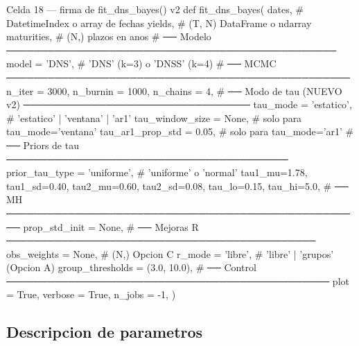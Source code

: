 \documentclass[12pt, a4paper]{article}
\theoremstyle{plain}
\theoremstyle{definition}
\theoremstyle{remark}
\begin{document}
\begin{codigocaja}{Celda 18 --- firma de fit\_dns\_bayes() v2}
def fit_dns_bayes(
    dates,                          # DatetimeIndex o array de fechas
    yields,                         # (T, N) DataFrame o ndarray
    maturities,                     # (N,) plazos en anos
    # ── Modelo ────────────────────────────────────────────────
    model            = 'DNS',       # 'DNS' (k=3) o 'DNSS' (k=4)
    # ── MCMC ──────────────────────────────────────────────────
    n_iter           = 3000,
    n_burnin         = 1000,
    n_chains         = 4,
    # ── Modo de tau (NUEVO v2) ─────────────────────────────────
    tau_mode         = 'estatico',  # 'estatico' | 'ventana' | 'ar1'
    tau_window_size  = None,        # solo para tau_mode='ventana'
    tau_ar1_prop_std = 0.05,        # solo para tau_mode='ar1'
    # ── Priors de tau ─────────────────────────────────────────
    prior_tau_type   = 'uniforme',  # 'uniforme' o 'normal'
    tau1_mu=1.78, tau1_sd=0.40,
    tau2_mu=0.60, tau2_sd=0.08,
    tau_lo=0.15,  tau_hi=5.0,
    # ── MH ────────────────────────────────────────────────────
    prop_std_init    = None,
    # ── Mejoras R ─────────────────────────────────────────────
    obs_weights      = None,        # (N,) Opcion C
    r_mode           = 'libre',     # 'libre' | 'grupos' (Opcion A)
    group_thresholds = (3.0, 10.0),
    # ── Control ───────────────────────────────────────────────
    plot    = True,
    verbose = True,
    n_jobs  = -1,
)
\end{codigocaja}

\subsection{Descripcion de parametros}
\end{document}

